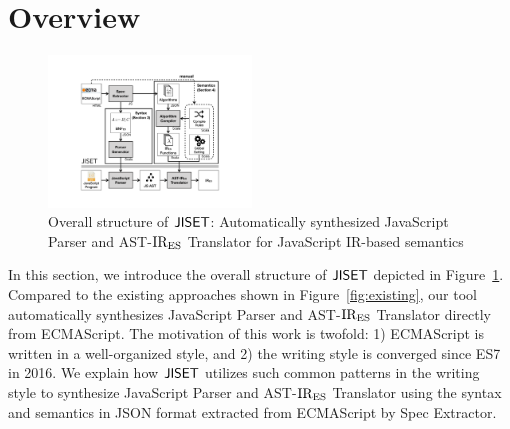 \section{Overview}\label{sec:overview}
\begin{figure}
  \centering
  \includegraphics[width=0.48\textwidth]{img/overview.pdf}
  \caption{Overall structure of \( \text{\sf JISET} \): Automatically synthesized {\sf
    JavaScript Parser} and {\sf AST-\( \text{IR}_\text{ES} \) Translator} for JavaScript
    IR-based semantics}
  \label{fig:overview}
\vspace*{-1em}
\end{figure}

In this section, we introduce the overall structure of \( \text{\sf JISET} \) depicted in
Figure~\ref{fig:overview}.  Compared to the existing approaches shown in
Figure~\ref{fig:existing}, our tool automatically synthesizes {\sf JavaScript
Parser} and {\sf AST-\( \text{IR}_\text{ES} \) Translator} directly from ECMAScript. The
motivation of this work is twofold: 1) ECMAScript is written in a well-organized
style, and 2) the writing style is converged since ES7 in 2016.
We explain how \( \text{\sf JISET} \) utilizes such common patterns in the writing style to
synthesize {\sf JavaScript Parser} and {\sf AST-\( \text{IR}_\text{ES} \) Translator}
using the syntax and semantics in JSON format
extracted from ECMAScript by {\sf Spec Extractor}.


